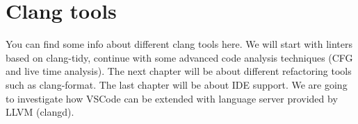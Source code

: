 \part{Clang tools}
You can find some info about different clang tools here. We will start with
linters based on clang-tidy, continue with some advanced code analysis
techniques (CFG and live time analysis). The next chapter will be about
different refactoring tools such as clang-format. The last chapter will be about
IDE support. We are going to investigate how VSCode can be extended with
language server provided by LLVM (clangd).

